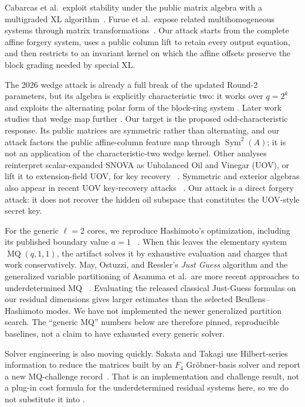 \documentclass[11pt]{article}
\newcommand{\Sym}{\operatorname{Sym}}
\newcommand{\SNOVA}{\textsf{SNOVA}}
\begin{document}
Cabarcas et al.\ exploit stability under the public matrix algebra with a
multigraded XL algorithm~\cite{Cabarcas2025SNOVA}.  Furue et al.\ expose related
multihomogeneous systems through matrix transformations~\cite{FurueEtAl2025}.  Our attack starts from the complete affine forgery
system, uses a public column lift to retain every output equation, and then
restricts to an invariant kernel on which the affine offsets preserve the
block grading needed by special XL.\@

The 2026 wedge attack is already a full break of the updated Round-2
parameters, but its algebra is explicitly characteristic two: it works over
$q=2^k$ and exploits the alternating polar form of the block-ring system
\cite{BrosEtAl2026SNOVAWedge}.  Later work studies that wedge map further
\cite{TsengEtAl2026Wedge}.  Our target is the proposed odd-characteristic
response.  Its public matrices are symmetric rather than alternating, and our
attack factors the public affine-column feature map through $\Sym^2(A)$; it is
not an application of the characteristic-two wedge kernel.  Other analyses
reinterpret scalar-expanded \SNOVA{} as Unbalanced Oil and Vinegar (UOV), or
lift it to extension-field UOV, for key recovery~%
\cite{IkematsuAkiyama2024,LiDing2024,NakamuraEtAl2025}.  Symmetric and
exterior algebras also appear in recent UOV key-recovery attacks~%
\cite{JinEtAl2026,Ran2026}.  Our attack is a direct forgery attack: it does not
recover the hidden oil subspace that constitutes the UOV-style secret key.

For the generic $\ell=2$ cores, we reproduce Hashimoto's optimization,
including its published boundary value $a=1$~%
\cite{Hashimoto2023,Beullens2024SNOVA}.  When this leaves the elementary system
$\operatorname{MQ}(q,1,1)$, the artifact solves it by exhaustive evaluation and
charges that work conservatively.  May, Ostuzzi, and Ressler's \emph{Just
Guess} algorithm and the generalized variable partitioning of Asanuma et al.\ are more recent approaches to underdetermined MQ~%
\cite{MayOstuzziRessler2026,AsanumaEtAl2026}.  Evaluating the released
classical Just-Guess formulas on our residual dimensions gives larger estimates
than the selected Beullens--Hashimoto modes.  We have not implemented the newer
generalized partition search.  The ``generic MQ'' numbers below are therefore
pinned, reproducible baselines, not a claim to have exhausted every generic
solver.

Solver engineering is also moving quickly.  Sakata and Takagi use
Hilbert-series information to reduce the matrices built by an $F_4$
Gr\"obner-basis solver and report a new MQ-challenge
record~\cite{SakataTakagi2026}.  That is an implementation and challenge
result, not a plug-in cost formula for the underdetermined residual systems
here, so we do not substitute it into .
\end{document}
